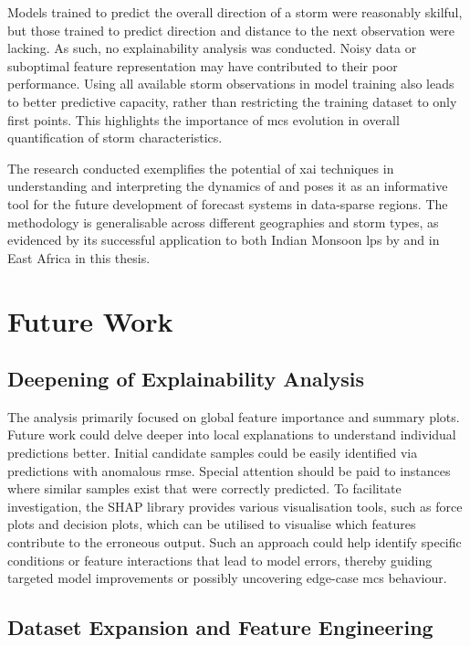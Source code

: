 Models trained to predict the overall direction of a storm were reasonably skilful, but those trained to predict direction and distance to the next observation were lacking. As such, no explainability analysis was conducted. Noisy data or suboptimal feature representation may have contributed to their poor performance. Using all available storm observations in model training also leads to better predictive capacity, rather than restricting the training dataset to only first points. This highlights the importance of \acrshort{mcs} evolution in overall quantification of storm characteristics.

The research conducted exemplifies the potential of \acrshort{xai} techniques in understanding and interpreting the dynamics of  and poses it as an informative tool for the future development of forecast systems in data-sparse regions. The methodology is generalisable across different geographies and storm types, as evidenced by its successful application to both Indian Monsoon \acrlong{lps} by \cite{Hunt2024} and  in East Africa in this thesis.

\section{Future Work}
\label{sec:future-work}

\subsection{Deepening of Explainability Analysis}

The analysis primarily focused on global feature importance and summary plots. Future work could delve deeper into local explanations to understand individual predictions better. Initial candidate samples could be easily identified via predictions with anomalous \acrshort{rmse}. Special attention should be paid to instances where similar samples exist that were correctly predicted. To facilitate investigation, the SHAP library provides various visualisation tools, such as force plots and decision plots, which can be utilised to visualise which features contribute to the erroneous output. Such an approach could help identify specific conditions or feature interactions that lead to model errors, thereby guiding targeted model improvements or possibly uncovering edge-case \acrshort{mcs} behaviour.

\subsection{Dataset Expansion and Feature Engineering}

